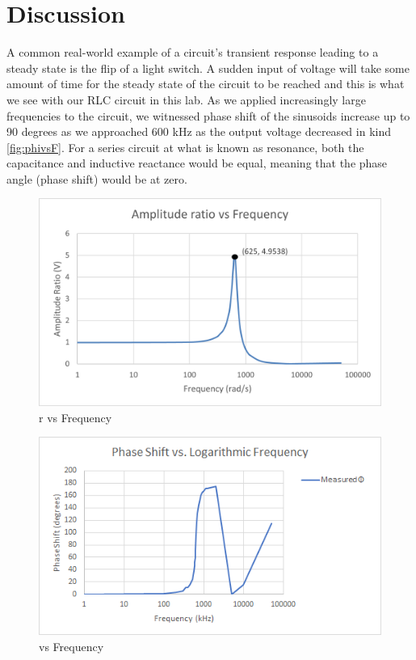 \documentclass[10pt,twocolumn]{article}
\begin{document}
\section{Discussion}

A common real-world example of a circuit’s transient response leading to a steady state is the flip of a light switch. A sudden input of voltage will take some amount of time for the steady state of the circuit to be reached and this is what we see with our RLC circuit in this lab. As we applied increasingly large frequencies to the circuit, we witnessed phase shift of the sinusoids increase up to 90 degrees as we approached 600 kHz as the output voltage decreased in kind \autoref{fig:phivsF}. For a series circuit at what is known as resonance, both the capacitance and inductive reactance would be equal, meaning that the phase angle (phase shift) would be at zero. 

\begin{figure}[bt]
	\centering
	\includegraphics[width=.9\linewidth]{figures/rvsF.png}
	\caption{r vs Frequency}
	\label{fig:rvsF}
\end{figure}

\begin{figure}[bt]
	\centering
	\includegraphics[width=.9\linewidth]{figures/phivsF.png}
	\caption{\Phi vs Frequency}
	\label{fig:phivsF}
\end{figure}
\end{document}
